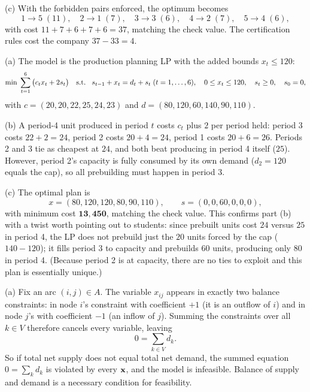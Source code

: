 (c) With the forbidden pairs enforced, the optimum becomes
\[
1 \to 5 \;(11), \quad 2 \to 1 \;(7), \quad 3 \to 3 \;(6), \quad 4 \to 2 \;(7), \quad 5 \to 4 \;(6),
\]
with cost $11 + 7 + 6 + 7 + 6 = 37$, matching the check value. The certification rules cost the company $37 - 33 = 4$.


(a) The model is the production planning LP with the added bounds $x_t \leq 120$:
\[
\min \; \sum_{t=1}^{6} \big(c_t x_t + 2 s_t\big) \quad \text{s.t.}\;\; \; s_{t-1} + x_t = d_t + s_t \; (t = 1, \dots, 6), \quad 0 \leq x_t \leq 120, \quad s_t \geq 0, \quad s_0 = 0,
\]
with $c = (20, 20, 22, 25, 24, 23)$ and $d = (80, 120, 60, 140, 90, 110)$.

(b) A period-4 unit produced in period $t$ costs $c_t$ plus $2$ per period held: period 3 costs $22 + 2 = 24$, period 2 costs $20 + 4 = 24$, period 1 costs $20 + 6 = 26$. Periods 2 and 3 tie as cheapest at $24$, and both beat producing in period 4 itself ($25$). However, period 2's capacity is fully consumed by its own demand ($d_2 = 120$ equals the cap), so all prebuilding must happen in period 3.

(c) The optimal plan is
\[
x = (80, 120, 120, 80, 90, 110), \qquad s = (0, 0, 60, 0, 0, 0),
\]
with minimum cost $\mathbf{13{,}450}$, matching the check value. This confirms part (b) with a twist worth pointing out to students: since prebuilt units cost $24$ versus $25$ in period 4, the LP does not prebuild just the $20$ units forced by the cap ($140 - 120$); it fills period 3 to capacity and prebuilds $60$ units, producing only $80$ in period 4. (Because period 2 is at capacity, there are no ties to exploit and this plan is essentially unique.)


(a) Fix an arc $(i,j) \in A$. The variable $x_{ij}$ appears in exactly two balance constraints: in node $i$'s constraint with coefficient $+1$ (it is an outflow of $i$) and in node $j$'s with coefficient $-1$ (an inflow of $j$). Summing the constraints over all $k \in V$ therefore cancels every variable, leaving
\[
0 = \sum_{k \in V} d_k.
\]
So if total net supply does not equal total net demand, the summed equation $0 = \sum_k d_k$ is violated by every $\mathbf{x}$, and the model is infeasible. Balance of supply and demand is a necessary condition for feasibility.

